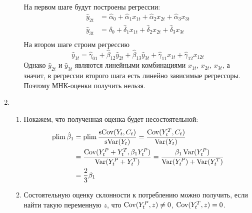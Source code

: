 \begin{enumerate}
\begin{enumerate}
На первом шаге будут построены регрессии:
\begin{align*}
\hat{y}_{2t} &= \hat{\alpha}_{0} + \hat{\alpha}_1 x_{1t} + \hat{\alpha}_2 x_{2t} + \hat{\alpha}_3 x_{3t} \\
\hat{y}_{3t} &= \hat{\delta}_{0} + \hat{\delta}_1 x_{1t} + \hat{\delta}_2 x_{2t} + \hat{\delta}_3 x_{3t} \\
\end{align*}
На втором шаге строим регрессию
\[
\hat{y}_{1t} = \hat{\gamma}_{01} + \hat{\beta}_{12} \hat{y}_{2t} + \hat{\beta}_{13} \hat{y}_{3t} + \hat{\gamma}_{11} x_{1t} + \hat{\gamma}_{12} x_{12t}
\]
Однако $\hat{y}_{2t}$ и $\hat{y}_{3t}$ являются линейными комбинациями $x_{1t}$,
$x_{2t}$, $x_{3t}$, а значит, в регрессии второго шага есть линейно зависимые регрессоры.
Поэтому МНК-оценки получить нельзя.
\end{enumerate}
\item
\begin{enumerate}
\item Покажем, что полученная оценка будет несостоятельной:
\begin{align*}
\operatorname*{plim} \hat \beta_1 &= \operatorname*{plim} \frac{\operatorname{sCov}(Y_t, C_t)}{\operatorname{sVar}(Y_t)} = \frac{\operatorname{Cov}(Y^T_t, C_t)}{\operatorname{Var}(Y_t)} \\
&= \frac{\operatorname{Cov}(Y_t^P + Y_t^T, \beta_1 Y_t^P)}{\operatorname{Var}(Y_t^P + Y_t^T)} = \frac{\beta_1 \operatorname{Var}(Y_t^P)}{\operatorname{Var}(Y_t^P) + \operatorname{Var}(Y_t^T)} \\
&= \frac{2}{3} \beta_1
\end{align*}
\item Состоятельную оценку склонности к потреблению можно получить,
если найти такую переменную $z$, что $\operatorname{Cov}(Y^P_t, z) \neq 0$, $\operatorname{Cov}(Y^T_t, z) = 0$.
\end{enumerate}
\end{enumerate}
